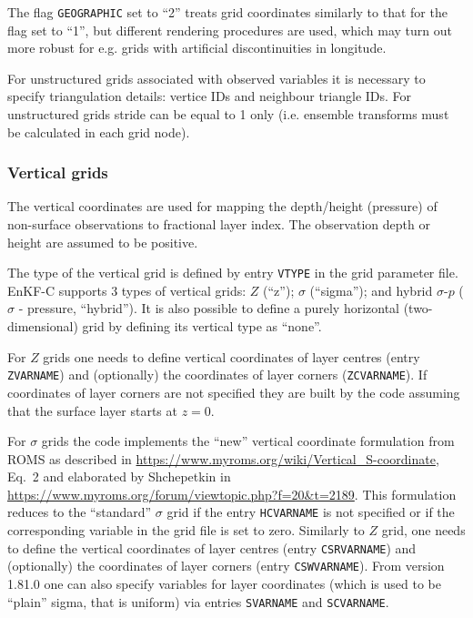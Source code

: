 \documentclass[11pt]{report}
\begin{document}
The flag \verb|GEOGRAPHIC| set to ``2'' treats grid coordinates similarly to that for the flag set to ``1'', but different rendering procedures are used, which may turn out more robust for e.g. grids with artificial discontinuities in longitude.

For unstructured grids associated with observed variables it is necessary to specify triangulation details: vertice IDs and neighbour triangle IDs.
For unstructured grids stride can be equal to 1 only (i.e. ensemble transforms must be calculated in each grid node).

\subsubsection{Vertical grids}

The vertical coordinates are used for mapping the depth/height (pressure) of non-surface observations to fractional layer index.
The observation depth or height are assumed to be positive.

The type of the vertical grid is defined by entry \verb|VTYPE| in the grid parameter file.
EnKF-C supports 3 types of vertical grids: $Z$ (``z''); $\sigma$ (``sigma''); and hybrid $\sigma$-$p$ ($\sigma$ - pressure, ``hybrid'').
It is also possible to define a purely horizontal (two-dimensional) grid by defining its vertical type as ``none''.

For $Z$ grids one needs to define vertical coordinates of layer centres (entry \verb|ZVARNAME|) and (optionally) the coordinates of layer corners (\verb|ZCVARNAME|).
If coordinates of layer corners are not specified they are built by the code assuming that the surface layer starts at $z = 0$.

For $\sigma$ grids the code implements the ``new'' vertical coordinate formulation from ROMS as described in \url{https://www.myroms.org/wiki/Vertical_S-coordinate}, Eq.~2 and elaborated by Shchepetkin in \url{https://www.myroms.org/forum/viewtopic.php?f=20&t=2189}.
This formulation reduces to the ``standard'' $\sigma$ grid if the entry \verb|HCVARNAME| is not specified or if the corresponding variable in the grid file is set to zero.
Similarly to $Z$ grid, one needs to define the vertical coordinates of layer centres (entry \verb|CSRVARNAME|) and (optionally) the coordinates of layer corners (entry \verb|CSWVARNAME|).
From version 1.81.0 one can also specify variables for layer coordinates (which is used to be ``plain'' sigma, that is uniform) via entries \verb|SVARNAME| and \verb|SCVARNAME|.
\end{document}
